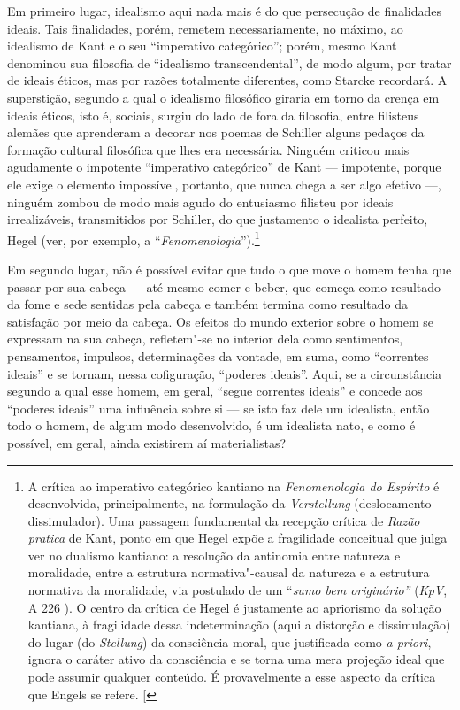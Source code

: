 Em primeiro lugar, idealismo aqui nada mais é do que persecução de
finalidades ideais. Tais finalidades, porém, remetem necessariamente, no
máximo, ao idealismo
de Kant e
o seu ``imperativo categórico''; porém,
mesmo Kant 
denominou sua filosofia de ``idealismo transcendental'', de modo algum,
por tratar de ideais éticos, mas por razões totalmente diferentes,
como Starcke recordará. A superstição, segundo a qual o idealismo
filosófico giraria em torno da crença em ideais éticos, isto é, sociais,
surgiu do lado de fora da filosofia, entre filisteus alemães que
aprenderam a decorar nos poemas
de Schiller alguns
pedaços da formação cultural filosófica que lhes era necessária. Ninguém
criticou mais agudamente o impotente ``imperativo categórico''
de Kant ---
impotente, porque ele exige o elemento impossível, portanto, que nunca
chega a ser algo efetivo ---, ninguém zombou de modo mais agudo do
entusiasmo filisteu por ideais irrealizáveis, transmitidos
por Schiller,
do que justamento o idealista perfeito, Hegel (ver, por exemplo,
a ``\emph{Fenomenologia}'').\footnote{A crítica ao imperativo
  categórico kantiano na \emph{Fenomenologia do Espírito} é
  desenvolvida, principalmente, na formulação da \emph{Verstellung}
  (deslocamento dissimulador). Uma passagem fundamental da recepção
  crítica de \emph{Razão pratica} de Kant, ponto em que Hegel expõe a
  fragilidade conceitual que julga ver no dualismo kantiano: a resolução
  da antinomia entre natureza e moralidade, entre a estrutura
  normativa"-causal da natureza e a estrutura normativa da moralidade,
  via postulado de um ``\emph{sumo bem originário''} (\emph{KpV}, A 226
  ). O centro da crítica de Hegel é justamente ao apriorismo da solução
  kantiana, à fragilidade dessa indeterminação (aqui a distorção e
  dissimulação) do lugar (do \emph{Stellung}) da consciência moral, que
  justificada como \emph{a priori}, ignora o caráter ativo da
  consciência e se torna uma mera projeção ideal que pode assumir
  qualquer conteúdo. É provavelmente a esse aspecto da crítica que
  Engels se refere. {[}\versal{N.\,T.}{]}}

Em segundo lugar, não é possível evitar que tudo o que move o homem
tenha que passar por sua cabeça --- até mesmo comer e beber, que começa
como resultado da fome e sede sentidas pela cabeça e também termina como
resultado da satisfação por meio da cabeça. Os efeitos do mundo exterior
sobre o homem se expressam na sua cabeça, refletem"-se no interior dela
como sentimentos, pensamentos, impulsos, determinações da vontade, em
suma, como ``correntes ideais'' e se tornam, nessa cofiguração,
``poderes ideais''. Aqui, se a circunstância segundo a qual esse homem,
em geral, ``segue correntes ideais'' e concede aos ``poderes ideais''
uma influência sobre si --- se isto faz dele um idealista, então todo o
homem, de algum modo desenvolvido, é um idealista nato, e como é
possível, em geral, ainda existirem aí materialistas?

